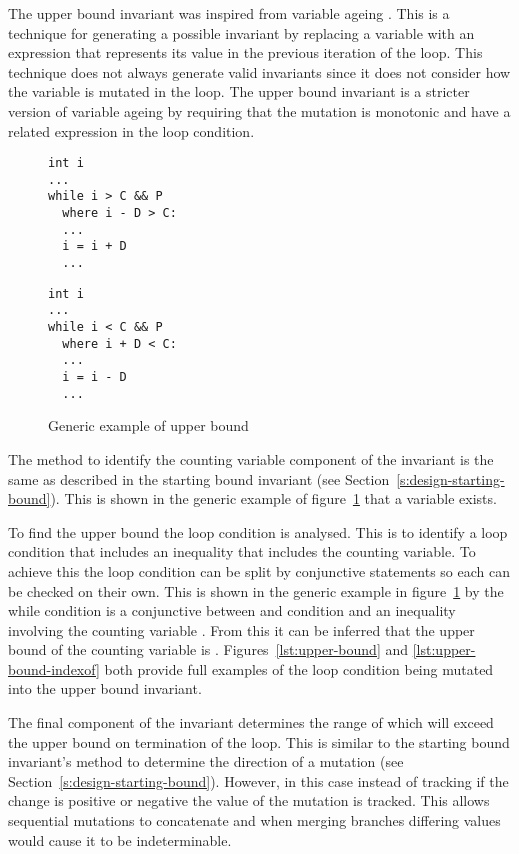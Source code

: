 The upper bound invariant was inspired from variable ageing
\cite{infer-dynamic}\cite{infer-postconditions}.
This is a technique for generating a possible invariant
by replacing a variable with an expression that represents
its value in the previous iteration of the loop.
This technique does not always generate valid invariants
since it does not consider how the variable is mutated in
the loop.
The upper bound invariant is a stricter version of
variable ageing by requiring that the mutation is
monotonic and have a related expression in the loop condition.

\begin{figure}[ht]
\noindent
\begin{minipage}{.45\textwidth}
\begin{lstlisting}
int i
...
while i > C && P
  where i - D > C:
  ...
  i = i + D
  ...
\end{lstlisting}
\end{minipage}\hfill
\begin{minipage}{.45\textwidth}
\begin{lstlisting}
int i
...
while i < C && P
  where i + D < C:
  ...
  i = i - D
  ...
\end{lstlisting}
\end{minipage}
\caption{Generic example of upper bound}
\label{lst:upper-bound-gen}
\end{figure}

The method to identify the counting variable component
of the invariant is the same as described in the 
starting bound invariant (see Section~\ref{s:design-starting-bound}).
This is shown in the generic example of figure~\ref{lst:upper-bound-gen}
that a variable  exists.

To find the upper bound the loop condition is analysed.
This is to identify a loop condition that includes an
inequality that includes the counting variable.
To achieve this the loop condition can be split
by conjunctive statements so each can be checked on their own.
This is shown in the generic example in figure~\ref{lst:upper-bound-gen}
by the while condition is a conjunctive between and condition 
and an inequality involving the counting variable .
From this it can be inferred that the upper bound of the counting 
variable is .
Figures~\ref{lst:upper-bound} and \ref{lst:upper-bound-indexof}
both provide full examples of the loop condition being mutated
into the upper bound invariant.

The final component of the invariant determines the range of 
which  will exceed the upper bound on termination of the
loop.
This is similar to the starting bound invariant's method to 
determine the direction of a mutation (see
Section~\ref{s:design-starting-bound}).
However, in this case instead of tracking if the change is positive or
negative the value of the mutation is tracked.
This allows sequential mutations to concatenate and when merging
branches differing values would cause it to be indeterminable.

